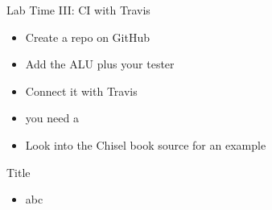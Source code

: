 \begin{frame}[fragile]{Lab Time III: CI with Travis}
\begin{itemize}
\item Create a repo on GitHub
\item Add the ALU plus your tester
\item Connect it with Travis
\item you need a 
\item Look into the Chisel book source for an example
\end{itemize}
\end{frame}



\begin{frame}[fragile]{Title}
\begin{itemize}
\item abc
\end{itemize}
\end{frame}
